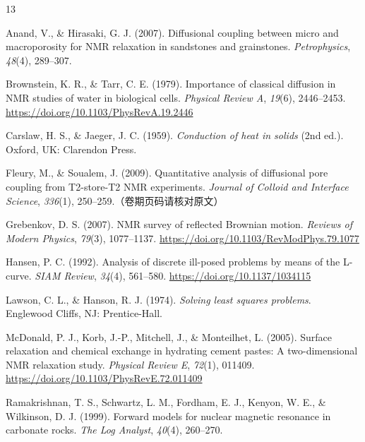 \documentclass[11pt,a4paper]{article}
\begin{document}
\begin{thebibliography}{13}
\setlength{\itemsep}{2pt}

Anand, V., \& Hirasaki, G. J. (2007). Diffusional coupling between micro and macroporosity for NMR relaxation in sandstones and grainstones.
\emph{Petrophysics}, \emph{48}(4), 289--307.

Brownstein, K. R., \& Tarr, C. E. (1979). Importance of classical diffusion in NMR studies of water in biological cells.
\emph{Physical Review A}, \emph{19}(6), 2446--2453. \url{https://doi.org/10.1103/PhysRevA.19.2446}

Carslaw, H. S., \& Jaeger, J. C. (1959). \emph{Conduction of heat in solids} (2nd ed.). Oxford, UK: Clarendon Press.

Fleury, M., \& Soualem, J. (2009). Quantitative analysis of diffusional pore coupling from T2-store-T2 NMR experiments.
\emph{Journal of Colloid and Interface Science}, \emph{336}(1), 250--259.（卷期页码请核对原文）

Grebenkov, D. S. (2007). NMR survey of reflected Brownian motion. \emph{Reviews of Modern Physics}, \emph{79}(3), 1077--1137.
\url{https://doi.org/10.1103/RevModPhys.79.1077}

Hansen, P. C. (1992). Analysis of discrete ill-posed problems by means of the L-curve. \emph{SIAM Review}, \emph{34}(4), 561--580.
\url{https://doi.org/10.1137/1034115}

Lawson, C. L., \& Hanson, R. J. (1974). \emph{Solving least squares problems}. Englewood Cliffs, NJ: Prentice-Hall.

McDonald, P. J., Korb, J.-P., Mitchell, J., \& Monteilhet, L. (2005). Surface relaxation and chemical exchange in hydrating cement pastes:
A two-dimensional NMR relaxation study. \emph{Physical Review E}, \emph{72}(1), 011409. \url{https://doi.org/10.1103/PhysRevE.72.011409}

Ramakrishnan, T. S., Schwartz, L. M., Fordham, E. J., Kenyon, W. E., \& Wilkinson, D. J. (1999). Forward models for nuclear magnetic resonance
in carbonate rocks. \emph{The Log Analyst}, \emph{40}(4), 260--270.


\end{thebibliography}
\end{document}
